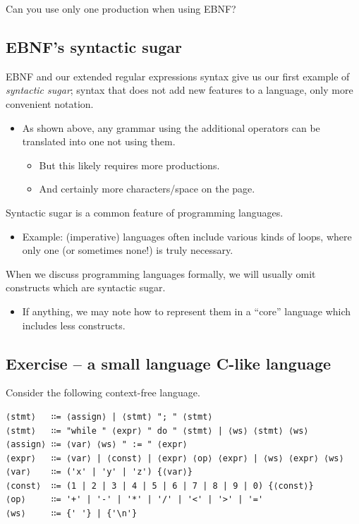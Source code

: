 \documentclass[11pt]{article}
\theoremstyle{definition}
\begin{document}
Can you use only one production when using EBNF?

\subsection{EBNF's syntactic sugar}
\label{sec:org95bf709}
EBNF and our extended regular expressions syntax
give us our first example of \emph{syntactic sugar};
syntax that does not add new features to a language,
only more convenient notation.
\begin{itemize}
\item As shown above, any grammar using the additional operators
can be translated into one not using them.
\begin{itemize}
\item But this likely requires more productions.
\item And certainly more characters/space on the page.
\end{itemize}
\end{itemize}

Syntactic sugar is a common feature of programming languages.
\begin{itemize}
\item Example: (imperative) languages often include various kinds of loops,
where only one (or sometimes none!) is truly necessary.
\end{itemize}

When we discuss programming languages formally,
we will usually omit constructs which are syntactic sugar.
\begin{itemize}
\item If anything, we may note how to represent them
in a “core” language which includes less constructs.
\end{itemize}

\subsection{Exercise – a small language C-like language}
\label{sec:org84c6c90}
Consider the following context-free language.
\begin{verbatim}
⟨stmt⟩   ∷= ⟨assign⟩ | ⟨stmt⟩ "; " ⟨stmt⟩
⟨stmt⟩   ∷= "while " ⟨expr⟩ " do " ⟨stmt⟩ | ⟨ws⟩ ⟨stmt⟩ ⟨ws⟩
⟨assign⟩ ∷= ⟨var⟩ ⟨ws⟩ " := " ⟨expr⟩
⟨expr⟩   ∷= ⟨var⟩ | ⟨const⟩ | ⟨expr⟩ ⟨op⟩ ⟨expr⟩ | ⟨ws⟩ ⟨expr⟩ ⟨ws⟩
⟨var⟩    ∷= ('x' | 'y' | 'z') {⟨var⟩}
⟨const⟩  ∷= (1 | 2 | 3 | 4 | 5 | 6 | 7 | 8 | 9 | 0) {⟨const⟩}
⟨op⟩     ∷= '+' | '-' | '*' | '/' | '<' | '>' | '='
⟨ws⟩     ∷= {' '} | {'\n'}
\end{verbatim}
\end{document}
